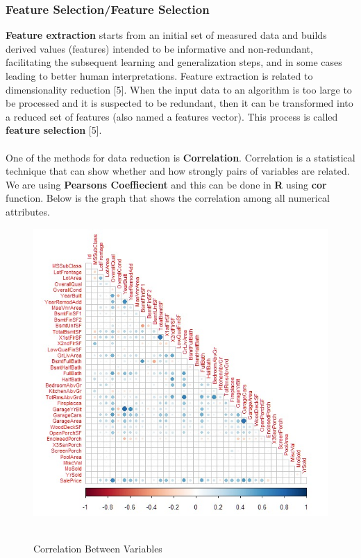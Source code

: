 \documentclass[fleqn,10pt]{SelfArx} %
\begin{document}
\subsubsection{Feature Selection/Feature Selection}
\textbf{Feature extraction} starts from an initial set of measured data and builds derived values (features) intended to be informative and non-redundant, facilitating the subsequent learning and generalization steps, and in some cases leading to better human interpretations. Feature extraction is related to dimensionality reduction [5].
When the input data to an algorithm is too large to be processed and it is suspected to be redundant, then it can be transformed into a reduced set of features (also named a features vector). This process is called \textbf{feature selection} [5].
\\ \\One of the methods for data reduction is \textbf{Correlation}. Correlation is a statistical technique that can show whether and how strongly pairs of variables are related. 
\\ We are using \textbf{Pearsons Coeffiecient} and this can be done in \textbf{R} using \textbf{cor} function. Below is the graph that shows the correlation among all numerical attributes.
\begin{figure}[h]
\includegraphics[scale=0.32]{Correlation}
\\ \caption{\\ Correlation Between Variables}
\end{figure}
\end{document}
